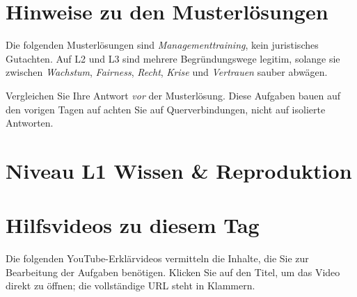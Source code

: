 \documentclass[11pt,a4paper,oneside]{article}
\begin{document}
\section*{Hinweise zu den Musterlösungen}
\thispagestyle{plain}

\noindent Die folgenden Musterlösungen sind \emph{Managementtraining}, kein juristisches Gutachten. Auf L2 und L3 sind mehrere Begründungswege legitim, solange sie zwischen \emph{Wachstum}, \emph{Fairness}, \emph{Recht}, \emph{Krise} und \emph{Vertrauen} sauber abwägen.

\begin{infobox}
Vergleichen Sie Ihre Antwort \emph{vor} der Musterlösung. Diese Aufgaben bauen auf den vorigen Tagen auf \textendash{} achten Sie auf Querverbindungen, nicht auf isolierte Antworten.
\end{infobox}

\clearpage

\section*{Niveau L1 \textendash{} Wissen \& Reproduktion}

\section*{Hilfsvideos zu diesem Tag}
\thispagestyle{plain}

\noindent Die folgenden YouTube-Erkl\"arvideos vermitteln die Inhalte, die Sie zur Bearbeitung der Aufgaben ben\"otigen. Klicken Sie auf den Titel, um das Video direkt zu \"offnen; die vollst\"andige URL steht in Klammern.
\end{document}
